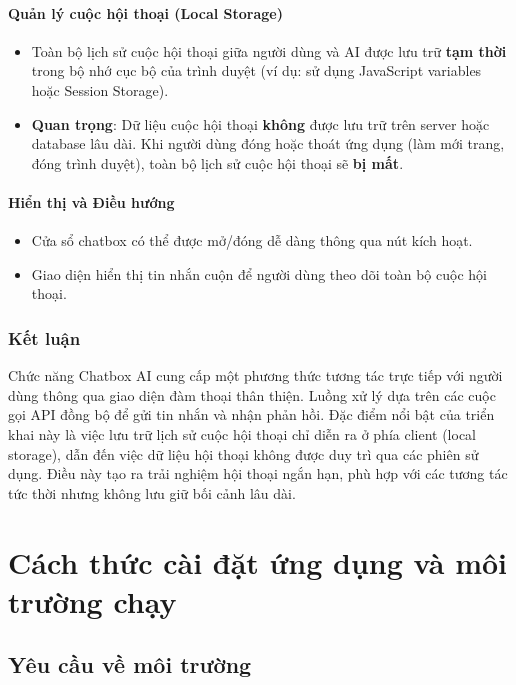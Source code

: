 \documentclass{book}
\let\oldsection\section
\renewcommand{\section}{\clearpage\oldsection}
\begin{document}
\subsubsection{Quản lý cuộc hội thoại (Local Storage)}
\begin{itemize}
    \item Toàn bộ lịch sử cuộc hội thoại giữa người dùng và AI được lưu trữ \textbf{tạm thời} trong bộ nhớ cục bộ của trình duyệt (ví dụ: sử dụng JavaScript variables hoặc Session Storage).
    \item \textbf{Quan trọng}: Dữ liệu cuộc hội thoại \textbf{không} được lưu trữ trên server hoặc database lâu dài. Khi người dùng đóng hoặc thoát ứng dụng (làm mới trang, đóng trình duyệt), toàn bộ lịch sử cuộc hội thoại sẽ \textbf{bị mất}.
\end{itemize}

\subsubsection{Hiển thị và Điều hướng}
\begin{itemize}
    \item Cửa sổ chatbox có thể được mở/đóng dễ dàng thông qua nút kích hoạt.
    \item Giao diện hiển thị tin nhắn cuộn để người dùng theo dõi toàn bộ cuộc hội thoại.
\end{itemize}

\subsection{Kết luận}
Chức năng Chatbox AI cung cấp một phương thức tương tác trực tiếp với người dùng thông qua giao diện đàm thoại thân thiện. Luồng xử lý dựa trên các cuộc gọi API đồng bộ để gửi tin nhắn và nhận phản hồi. Đặc điểm nổi bật của triển khai này là việc lưu trữ lịch sử cuộc hội thoại chỉ diễn ra ở phía client (local storage), dẫn đến việc dữ liệu hội thoại không được duy trì qua các phiên sử dụng. Điều này tạo ra trải nghiệm hội thoại ngắn hạn, phù hợp với các tương tác tức thời nhưng không lưu giữ bối cảnh lâu dài.

\chapter{Cách thức cài đặt ứng dụng và môi trường chạy}
\section{Yêu cầu về môi trường}
\end{document}
